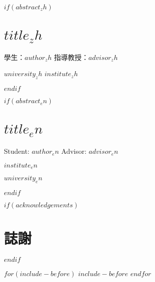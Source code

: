 \documentclass[$if(fontsize)$$fontsize$,$endif$$if(lang)$$babel-lang$,$endif$$if(papersize)$$papersize$paper,$endif$$for(classoption)$$classoption$$sep$,$endfor$]{$documentclass$}
\def\LARGE{\fontsize{20}{30}\selectfont}%
\begin{document}
\newcommand\frontmatter{
    \cleardoublepage
    \pagenumbering{roman}
}

\newcommand\mainmatter{
    \cleardoublepage
    \pagenumbering{arabic}
}

\newcommand\backmatter{
    \if@openright
        \cleardoublepage
    \else
        \clearpage
    \fi
}

\frontmatter

$if(abstract_zh)$
\renewcommand{\abstractname}{\LARGE \center 中文摘要}
\chapter*{$title_zh$}
\vspace{1.5cm}
\centerline{學生：$author_zh$ \hfill 指導教授：$advisor_zh$}
\vspace{1.5cm}
\centerline{$university_zh$ $institute_zh$}
\vspace{2cm}
\centerline{\fontsize{20}{30}}
\vspace{1cm}
\fontsize{14}{21}\selectfont{$abstract_zh$}
$endif$

$if(abstract_en)$
\renewcommand{\abstractname}{\LARGE \center Abstract}
\chapter*{$title_en$}
\vspace{1.5cm}
\centerline{Student: $author_en$ \hfill Advisor: $advisor_en$}
\vspace{1.5cm}
\centerline{$institute_en$}
\centerline{$university_en$}
\vspace{2cm}
\centerline{\fontsize{20}{30}}
\vspace{1cm}
\fontsize{14}{21}\selectfont{$abstract_en$}
$endif$

$if(acknowledgements)$
\renewcommand{\abstractname}{\LARGE \center 誌謝}
\chapter*{誌謝}
\fontsize{14}{21}\selectfont{$acknowledgements$}
$endif$

$for(include-before)$
$include-before$
$endfor$
\end{document}
